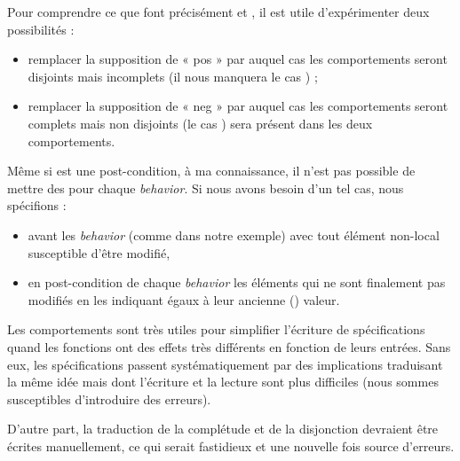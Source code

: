 Pour comprendre ce que font précisément  et , il est utile
d'expérimenter deux possibilités :



\begin{itemize}
\item remplacer la supposition de « pos » par  auquel cas les 
comportements seront disjoints mais incomplets (il nous manquera le cas 
) ;
\item remplacer la supposition de « neg » par  auquel cas les 
comportements seront complets mais non disjoints (le cas ) sera
présent dans les deux comportements.
\end{itemize}


\begin{Warning}
Même si  est une post-condition, à ma connaissance, il n'est pas 
possible de mettre des  pour chaque \textit{behavior}. Si nous avons
besoin d'un tel cas, nous spécifions :

\begin{itemize}
\item {} avant les \textit{behavior} (comme dans notre exemple) avec tout 
élément non-local susceptible d'être modifié,
\item en post-condition de chaque \textit{behavior} les éléments qui ne sont finalement 
pas modifiés en les indiquant égaux à leur ancienne () valeur.
\end{itemize}
\end{Warning}


Les comportements sont très utiles pour simplifier l'écriture de spécifications
quand les fonctions ont des effets très différents en fonction de leurs 
entrées. Sans eux, les spécifications passent systématiquement par des 
implications traduisant la même idée mais dont l'écriture et la lecture sont 
plus difficiles (nous sommes susceptibles d'introduire des erreurs).



D'autre part, la traduction de la complétude et de la disjonction devraient 
être écrites manuellement, ce qui serait fastidieux et une nouvelle fois source
d'erreurs.
